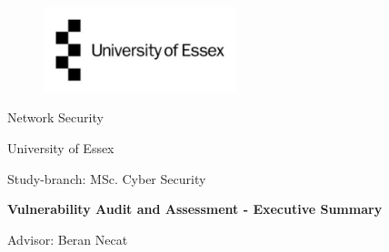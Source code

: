 
\label{titlePage}
\begin{figure}[h]
\centering
\includegraphics[width=0.50\textwidth]{pics/logo.pdf}
\end{figure}
\FloatBarrier

\begin{Large} 
\begin{center}
Network Security
\end{center}
\end{Large} 

\vspace*{5mm}

\begin{large} 
\begin{center}
University of Essex
\end{center}
\end{large} 

\begin{large} 
\begin{center}
Study-branch: MSc. Cyber Security
\end{center}
\end{large}



\begin{Large} 
\begin{center}
\textbf{Vulnerability Audit and Assessment - Executive Summary}
\end{center}
\end{Large}

\vspace*{5mm}

\begin{large} 
\begin{center}
Advisor: Beran Necat
\end{center}
\end{large} 




\pagestyle{empty} %

